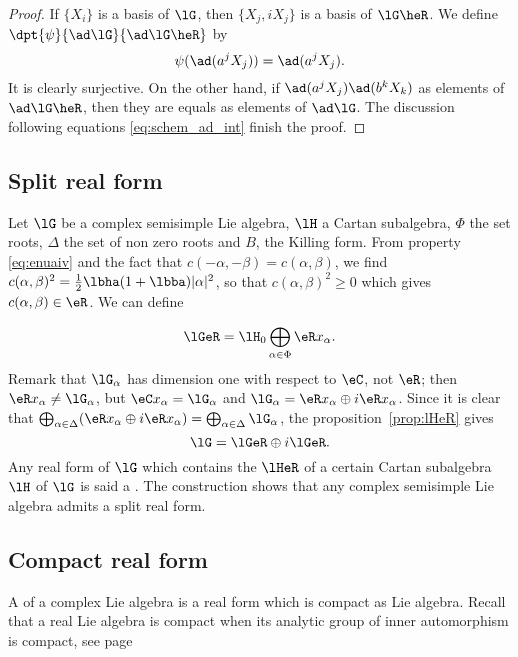 \begin{proof}
If $\{X_i\}$ is a basis of $\lG$, then $\{X_j,iX_j\}$ is a basis of $\lG\heR$. We define $\dpt{\psi}{\ad\lG}{\ad\lG\heR}$ by
\[
   \psi(\ad(a^jX_j))=\ad(a^jX_j).
\]
It is clearly surjective. On the other hand, if $\ad(a^jX_j)\ad(b^kX_k)$ as elements of $\ad\lG\heR$, then they are equals as elements of $\ad\lG$. The discussion following equations \eqref{eq:schem_ad_int} finish the proof.
\end{proof}

\subsection{Split real form}

Let $\lG$ be a complex semisimple Lie algebra, $\lH$ a Cartan subalgebra, $\Phi$ the set roots, $\Delta$ the set of non zero roots and $B$, the Killing form. From property \eqref{eq:enuaiv} and the fact that $c(-\alpha,-\beta)=c(\alpha,\beta)$, we find $c(\alpha,\beta)^2=\frac{1}{2}\lbha(1+\lbba)|\alpha|^2$,
 so that $c(\alpha,\beta)^2\geq 0$ which gives $c(\alpha,\beta)\in\eR$. We can define

\[
   \lGeR=\lH_0\bigoplus_{\alpha\in\Phi}\eR x_{\alpha}.
\]
Remark that $\lG_{\alpha}$ has dimension one with respect to $\eC$, not $\eR$; then $\eR x_{\alpha}\neq\lG_{\alpha}$, but $\eC x_{\alpha}=\lG_{\alpha}$ and $\lG_{\alpha}=\eR x_{\alpha}\oplus i\eR x_{\alpha}$. Since it is clear that $\bigoplus_{\alpha\in\Delta}( \eR x_{\alpha}\oplus i\eR x_{\alpha} )=\bigoplus_{\alpha\in\Delta}\lG_{\alpha}$, the proposition~\ref{prop:lHeR} gives
\begin{equation}
  \lG=\lGeR\oplus i\lGeR.
\end{equation}
Any real form of $\lG$ which contains the $\lHeR$ of a certain Cartan subalgebra $\lH$ of $\lG$ is said a . The construction shows that any complex semisimple Lie algebra admits a split real form.

\subsection{Compact real form}

A  of a complex Lie algebra is a real form which is compact as Lie algebra. Recall that a real Lie algebra is compact when its analytic group of inner automorphism is compact, see page \pageref{pg:compact_Lie}

